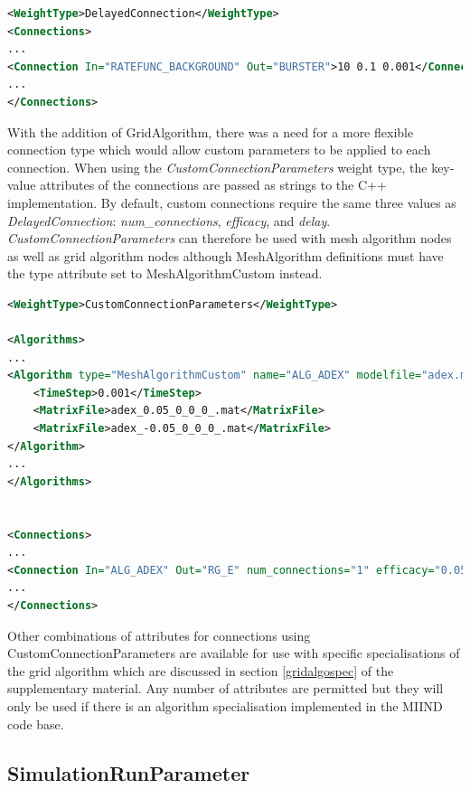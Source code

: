 \documentclass[utf8]{frontiersSCNS} %
\begin{document}
\begin{lstlisting}[language=xml,caption={A DelayedConnection with number of connections = 10, efficacy = 0.1, and delay of 1ms.}]
<WeightType>DelayedConnection</WeightType>
<Connections>
...
<Connection In="RATEFUNC_BACKGROUND" Out="BURSTER">10 0.1 0.001</Connection>
...
</Connections>
\end{lstlisting}

With the addition of GridAlgorithm, there was a need for a more flexible connection type which would allow custom parameters to be applied to each connection. When using the \textit{CustomConnectionParameters} weight type, the key-value attributes of the connections are passed as strings to the C++ implementation. By default, custom connections require the same three values as \textit{DelayedConnection}: \textit{num\_connections}, \textit{efficacy}, and \textit{delay}. \textit{CustomConnectionParameters} can therefore be used with mesh algorithm nodes as well as grid algorithm nodes although MeshAlgorithm definitions must have the type attribute set to MeshAlgorithmCustom instead.

\begin{lstlisting}[language=xml,caption={A MeshAlgorithmCustom definition for use with WeightType=CustomConnectionParameters and a Connection using the num\_connections, efficacy, and delay attributes.}]
<WeightType>CustomConnectionParameters</WeightType>

<Algorithms>
...
<Algorithm type="MeshAlgorithmCustom" name="ALG_ADEX" modelfile="adex.model" >
	<TimeStep>0.001</TimeStep>
	<MatrixFile>adex_0.05_0_0_0_.mat</MatrixFile>
	<MatrixFile>adex_-0.05_0_0_0_.mat</MatrixFile>
</Algorithm>
...
</Algorithms>


<Connections>
...
<Connection In="ALG_ADEX" Out="RG_E" num_connections="1" efficacy="0.05" delay="0.0"/>
...
</Connections>
\end{lstlisting}

Other combinations of attributes for connections using CustomConnectionParameters are available for use with specific specialisations of the grid algorithm which are discussed in section \ref{gridalgospec} of the supplementary material. Any number of attributes are permitted but they will only be used if there is an algorithm specialisation implemented in the MIIND code base.

\subsection{SimulationRunParameter}
\end{document}
